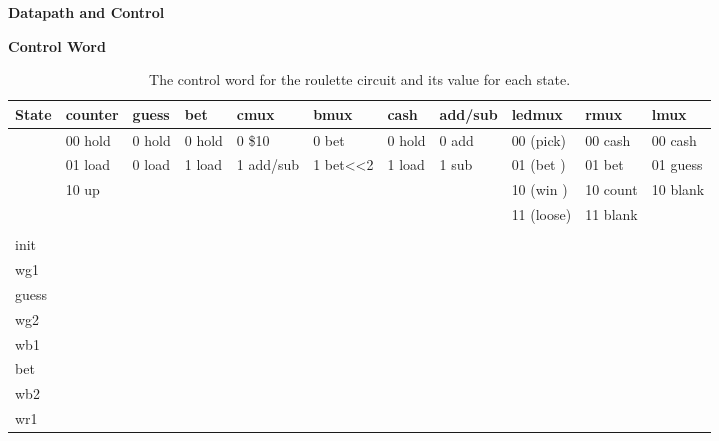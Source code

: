 \begin{description}
\begin{landscape}
\textbf{Datapath and Control}
\begin{figure}[ht]
\end{figure}

\pagebreak

\textbf{ Control Word}

\begin{table}
\caption{The control word for the roulette circuit and its value for each state.}
\label{table:roulette}
{\small
\begin{tabular}{l|l|l|l|l|l|l|l|l|l|l}

State &  counter& guess  & bet    & cmux      & bmux     & cash   & add/sub & ledmux    & rmux   & lmux \\ \hline
      & 00 hold & 0 hold & 0 hold & 0 \$10    & 0 bet    & 0 hold & 0 add  & 00 (pick) &00 cash &00 cash  \\ \hline
      & 01 load & 0 load & 1 load & 1 add/sub & 1 bet<<2 & 1 load & 1 sub  & 01 (bet ) &01 bet  &01 guess \\ \hline
      & 10 up   &        &        &  	      &          &        &        & 10 (win ) &10 count&10 blank \\ \hline
      &         &        &        &  	      &          &        &        & 11 (loose)&11 blank&         \\ \hline
      &         &        &        &  	      &          &        &        &          &         &   \\ \hline
init  &       &       &       & 	      &         &       &       &        &       & \\ \hline
wg1   &       &       &       & 	      &         &       &       &        &       & \\ \hline
guess &       &       &       & 	      &         &       &       &        &       & \\ \hline
wg2   &       &       &       & 	      &         &       &       &        &       & \\ \hline
wb1   &       &       &       & 	      &         &       &       &        &       & \\ \hline
bet   &       &       &       & 	      &         &       &       &        &       & \\ \hline
wb2   &       &       &       & 	      &         &       &       &        &       & \\ \hline
wr1   &       &       &       & 	      &         &       &       &        &       & \\ \hline

\end{tabular}}
\end{table}
\end{landscape}
\end{description}
